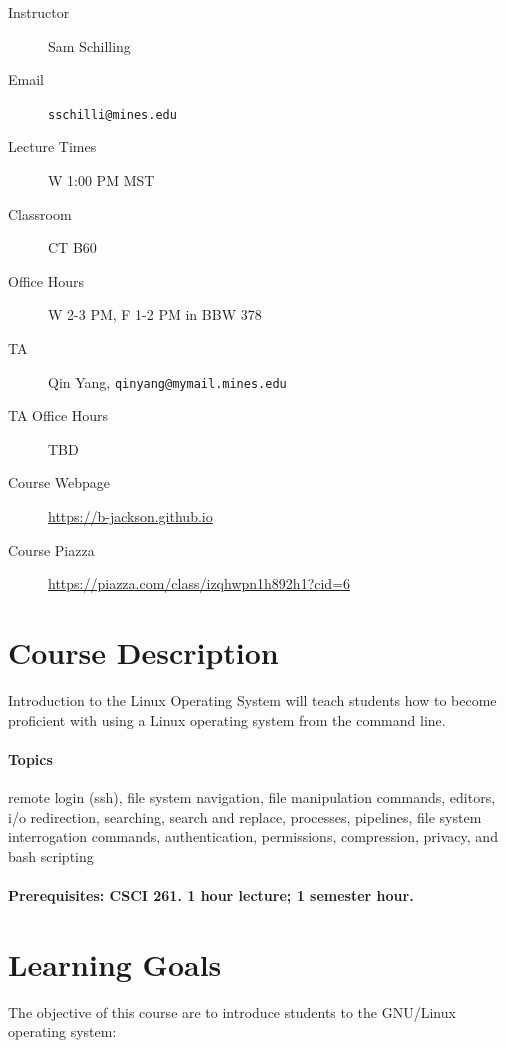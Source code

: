 \documentclass[12pt]{article}
\begin{document}
	\maketitle
\begin{description}
	\item[Instructor] Sam Schilling
	\item[Email] \texttt{sschilli@mines.edu}
	\item[Lecture Times] W 1:00 PM MST
	\item[Classroom] CT B60
	\item[Office Hours] W 2-3 PM, F 1-2 PM in BBW 378
        \item[TA] Qin Yang, \texttt{qinyang@mymail.mines.edu}
        \item[TA Office Hours] TBD
        \item[Course Webpage] \href{https://b-jackson.github.io}{https://b-jackson.github.io}
        \item[Course Piazza] \href{https://piazza.com/class/izqhwpn1h892h1?cid=6}{https://piazza.com/class/izqhwpn1h892h1?cid=6}
\end{description}
\section{Course Description}
Introduction to the Linux Operating System will teach students how to become proficient with using a Linux operating system from the command
line.

\paragraph{Topics} remote login (ssh), file system navigation, file manipulation commands, editors, i/o redirection, searching, search and replace,
processes, pipelines, file system interrogation commands, authentication, permissions, compression, privacy, and bash scripting

\paragraph{Prerequisites: CSCI 261. 1 hour lecture; 1 semester hour.}
\section{Learning Goals}
The objective of this course are to introduce students to the GNU/Linux operating system:
\end{document}
